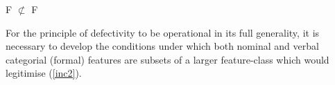 \documentclass[output=paper]{langsci/langscibook}
\begin{document}
\begin{multicols}{2}
\begin{exe}
\begin{tikzpicture}[baseline]
        \end{tikzpicture}%
        \label{inc1}
     \ex F $\nsubset$ F\\
    \label{inc2}
\end{exe}
\end{multicols}

For the principle of defectivity to be operational in its full generality, it
is necessary to develop the conditions under which both nominal and verbal
categorial (formal) features are subsets of a larger feature-class which would
legitimise (\ref{inc2}).
\end{document}
